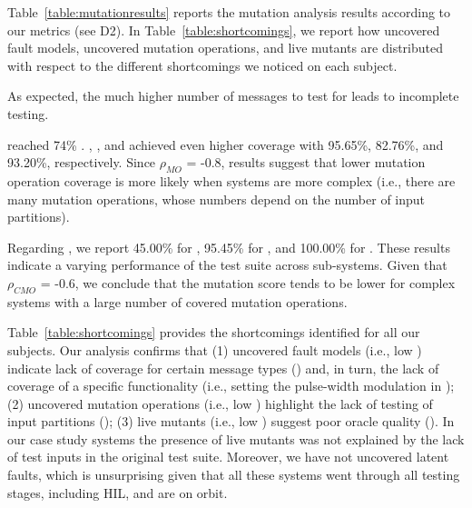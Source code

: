 



Table~\ref{table:mutationresults} reports the mutation analysis results according to our metrics (see D2).
In Table~\ref{table:shortcomings}, we report how uncovered fault models, uncovered mutation operations, and live mutants are distributed with respect to the different shortcomings we noticed on each subject.

As expected, the much higher number of messages to test for \ADCS leads to incomplete testing.

\ADCS reached 74\% .  \GPS, \PDHU, and \PARAM  achieved even higher coverage with 95.65\%, 82.76\%, and 93.20\%,  respectively. Since
$\rho_{MO}$ = -0.8, results suggest that lower mutation operation coverage is more likely when systems are more complex (i.e., there are many mutation operations, whose numbers depend on the number of input partitions).

Regarding , we report 45.00\% for \ADCS,  95.45\% for \GPS,  and 100.00\% for \PDHU. These results indicate a varying performance of the \SVF test suite across sub-systems.
Given that
$\rho_{CMO}$ = -0.6,
we conclude that the mutation score tends to be lower for complex systems with a large number of covered mutation operations.

Table~\ref{table:shortcomings} provides the shortcomings identified for all our subjects.
Our analysis confirms that (1) uncovered fault models (i.e., low ) indicate lack of coverage for certain message types () and, in turn, the lack of coverage of a specific functionality (i.e., setting the pulse-width modulation in \ADCS); (2) uncovered mutation operations (i.e., low ) highlight the lack of testing of input partitions (); (3) live mutants (i.e., low ) suggest poor oracle quality (). In our case study systems the presence of live mutants was not explained by the lack of test inputs in the original test suite. Moreover, we have not uncovered latent faults, which is unsurprising given that all these systems went through all testing stages, including HIL, and are on orbit.


